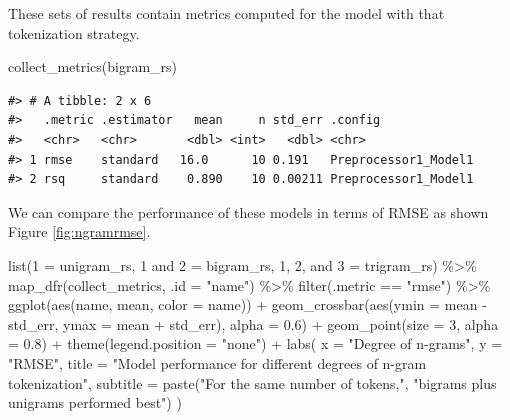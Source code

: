 \documentclass[
]{krantz}
\makeatletter
\newenvironment{Shaded}{\begin{snugshade}}{\end{snugshade}}
\newcommand{\AttributeTok}[1]{\textcolor[rgb]{0.77,0.63,0.00}{#1}}
\newcommand{\DecValTok}[1]{\textcolor[rgb]{0.00,0.00,0.81}{#1}}
\newcommand{\FloatTok}[1]{\textcolor[rgb]{0.00,0.00,0.81}{#1}}
\newcommand{\FunctionTok}[1]{\textcolor[rgb]{0.00,0.00,0.00}{#1}}
\newcommand{\NormalTok}[1]{#1}
\newcommand{\OtherTok}[1]{\textcolor[rgb]{0.56,0.35,0.01}{#1}}
\newcommand{\SpecialCharTok}[1]{\textcolor[rgb]{0.00,0.00,0.00}{#1}}
\newcommand{\StringTok}[1]{\textcolor[rgb]{0.31,0.60,0.02}{#1}}
\newenvironment{kframe}{%
\medskip{}
\setlength{\fboxsep}{.8em}
 \def\at@end@of@kframe{}%
 \ifinner\ifhmode%
  \def\at@end@of@kframe{\end{minipage}}%
  \begin{minipage}{\columnwidth}%
 \fi\fi%
 \def\FrameCommand##1{\hskip\@totalleftmargin \hskip-\fboxsep
 \colorbox{shadecolor}{##1}\hskip-\fboxsep
     \hskip-\linewidth \hskip-\@totalleftmargin \hskip\columnwidth}%
 \MakeFramed {\advance\hsize-\width
   \@totalleftmargin\z@ \linewidth\hsize
   \@setminipage}}%
 {\par\unskip\endMakeFramed%
 \at@end@of@kframe}
\renewenvironment{Shaded}{\begin{kframe}}{\end{kframe}}
\makeatother
\begin{document}
These sets of results contain metrics computed for the model with that tokenization strategy.

\begin{Shaded}
\begin{Highlighting}[]
\FunctionTok{collect\_metrics}\NormalTok{(bigram\_rs)}
\end{Highlighting}
\end{Shaded}

\begin{verbatim}
#> # A tibble: 2 x 6
#>   .metric .estimator   mean     n std_err .config             
#>   <chr>   <chr>       <dbl> <int>   <dbl> <chr>               
#> 1 rmse    standard   16.0      10 0.191   Preprocessor1_Model1
#> 2 rsq     standard    0.890    10 0.00211 Preprocessor1_Model1
\end{verbatim}

We can compare the performance of these models in terms of RMSE as shown Figure \ref{fig:ngramrmse}.

\begin{Shaded}
\begin{Highlighting}[]
\FunctionTok{list}\NormalTok{(}\StringTok{\textasciigrave{}}\AttributeTok{1}\StringTok{\textasciigrave{}} \OtherTok{=}\NormalTok{ unigram\_rs,}
     \StringTok{\textasciigrave{}}\AttributeTok{1 and 2}\StringTok{\textasciigrave{}} \OtherTok{=}\NormalTok{ bigram\_rs,}
     \StringTok{\textasciigrave{}}\AttributeTok{1, 2, and 3}\StringTok{\textasciigrave{}} \OtherTok{=}\NormalTok{ trigram\_rs) }\SpecialCharTok{\%\textgreater{}\%}
  \FunctionTok{map\_dfr}\NormalTok{(collect\_metrics, }\AttributeTok{.id =} \StringTok{"name"}\NormalTok{) }\SpecialCharTok{\%\textgreater{}\%}
  \FunctionTok{filter}\NormalTok{(.metric }\SpecialCharTok{==} \StringTok{"rmse"}\NormalTok{) }\SpecialCharTok{\%\textgreater{}\%}
  \FunctionTok{ggplot}\NormalTok{(}\FunctionTok{aes}\NormalTok{(name, mean, }\AttributeTok{color =}\NormalTok{ name)) }\SpecialCharTok{+}
  \FunctionTok{geom\_crossbar}\NormalTok{(}\FunctionTok{aes}\NormalTok{(}\AttributeTok{ymin =}\NormalTok{ mean }\SpecialCharTok{{-}}\NormalTok{ std\_err, }\AttributeTok{ymax =}\NormalTok{ mean }\SpecialCharTok{+}\NormalTok{ std\_err), }\AttributeTok{alpha =} \FloatTok{0.6}\NormalTok{) }\SpecialCharTok{+}
  \FunctionTok{geom\_point}\NormalTok{(}\AttributeTok{size =} \DecValTok{3}\NormalTok{, }\AttributeTok{alpha =} \FloatTok{0.8}\NormalTok{) }\SpecialCharTok{+}
  \FunctionTok{theme}\NormalTok{(}\AttributeTok{legend.position =} \StringTok{"none"}\NormalTok{) }\SpecialCharTok{+}
  \FunctionTok{labs}\NormalTok{(}
    \AttributeTok{x =} \StringTok{"Degree of n{-}grams"}\NormalTok{,}
    \AttributeTok{y =} \StringTok{"RMSE"}\NormalTok{,}
    \AttributeTok{title =} \StringTok{"Model performance for different degrees of n{-}gram tokenization"}\NormalTok{,}
    \AttributeTok{subtitle =} \FunctionTok{paste}\NormalTok{(}\StringTok{"For the same number of tokens,"}\NormalTok{,}
                     \StringTok{"bigrams plus unigrams performed best"}\NormalTok{)}
\NormalTok{  )}
\end{Highlighting}
\end{Shaded}
\end{document}
